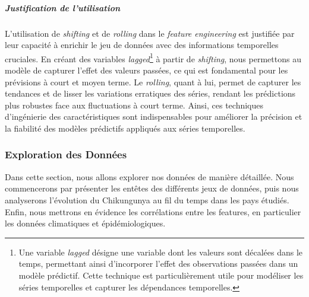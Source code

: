 \subparagraph{Justification de l'utilisation}

L'utilisation de \textit{shifting} et de \textit{rolling} dans le \textit{feature engineering} est justifiée par leur capacité à enrichir le jeu de données avec des informations temporelles cruciales. En créant des variables \textit{lagged}\footnote{Une variable \textit{lagged} désigne une variable dont les valeurs sont décalées dans le temps, permettant ainsi d'incorporer l'effet des observations passées dans un modèle prédictif. Cette technique est particulièrement utile pour modéliser les séries temporelles et capturer les dépendances temporelles.} à partir de \textit{shifting}, nous permettons au modèle de capturer l'effet des valeurs passées, ce qui est fondamental pour les prévisions à court et moyen terme. Le \textit{rolling}, quant à lui, permet de capturer les tendances et de lisser les variations erratiques des séries, rendant les prédictions plus robustes face aux fluctuations à court terme. Ainsi, ces techniques d'ingénierie des caractéristiques sont indispensables pour améliorer la précision et la fiabilité des modèles prédictifs appliqués aux séries temporelles.


\subsubsection{Exploration des Données}
Dans cette section, nous allons explorer nos données de manière détaillée. Nous commencerons par présenter les entêtes des différents jeux de données, puis nous analyserons l'évolution du Chikungunya au fil du temps dans les pays étudiés. Enfin, nous mettrons en évidence les corrélations entre les features, en particulier les données climatiques et épidémiologiques.

